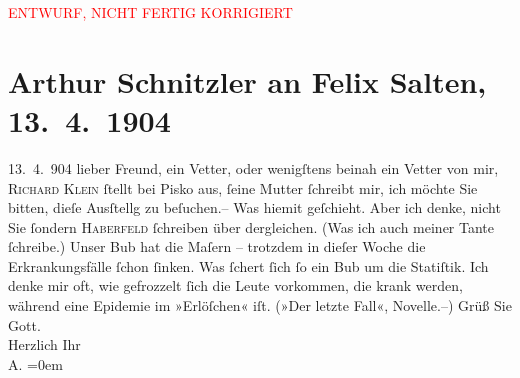 
\begin{center}
            \textcolor{red}{ENTWURF, NICHT FERTIG KORRIGIERT}
                      \end{center}
            
         
         \renewcommand{\erwaehntePersonen}{Personen: Hugo Haberfeld, Richard Klein, Bertha Klein, Felix Salten, Heinrich Schnitzler}
         \renewcommand{\erwaehnteInstitutionen}{Institutionen: Galerie Pisko}
         \renewcommand{\erwaehnteOrte}{Orte: Wien}
         \renewcommand{\erwaehnteWerke}{}
               \section[Arthur Schnitzler an Felix Salten, 13. 4. 1904]{ Arthur Schnitzler an Felix Salten, 13. 4. 1904}\nopagebreak{}\rehead{ }\begin{ledgroupsized}[t]{13cm}\normalsize\beginnumbering \toendnotes[C]{\smallbreak\pagebreak[2]} 
\toendnotes[C]{\smallbreak}\pstart
           \raggedleft{}{\pb}13. 4. 904\pend
           \pstart
           lieber Freund, ein Vetter, oder wenigſtens beinah ein Vetter von
               mir, \textsc{Richard Klein} ſtellt bei Pisko aus, ſeine Mutter ſchreibt mir, ich
               möchte Sie bitten, dieſe Ausſtellg zu beſuchen.– Was hiemit geſchieht. Aber ich
               denke, nicht Sie ſondern \textsc{Haberfeld} ſchrei{\pb}ben über dergleichen. (Was ich
               auch meiner Tante
               ſchreibe.) \pend
           \pstart
           Unser Bub hat die Maſern –
               trotzdem in dieſer Woche die Erkrankungsfälle ſchon ſinken. Was ſchert ſich ſo ein
               Bub um die Statiſtik. Ich denke mir oft, wie gefrozzelt ſich die Leute vorkommen, die
               krank werden, während eine {\pb}Epidemie im
               »Erlöſchen« iſt. (»Der letzte Fall«, Novelle.–) \pend
           \pstart
           Grüß Sie Gott. {\\[\baselineskip]}Herzlich Ihr {\\[\baselineskip]}\spacefill\mbox{A.}\pend
           \leftskip=0em{}
         

\end{ledgroupsized}
